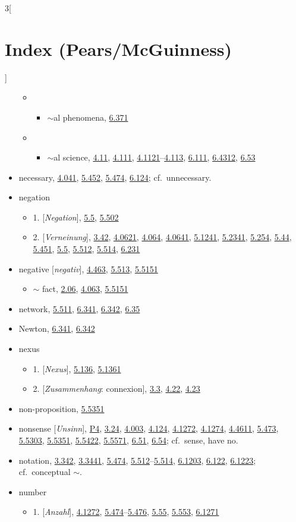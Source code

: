 \documentclass[oneside,openany,12pt]{book}
\newcommand{\indexentry}[1]{\item #1}
\newcommand{\indexsubentry}[1]{\begin{itemize} \item #1 \end{itemize}}
\newcommand{\indexsubsubentry}[1]{\begin{itemize} \item \begin{itemize} \item #1 \end{itemize} \end{itemize}}
\newcommand{\indexref}[1]{\hyperlink{prop#1}{#1}}
\begin{document}
\begin{multicols}{3}[\section*{Index (Pears/McGuinness)}]
\begin{itemize}
   \indexsubsubentry{$\sim$al phenomena, \indexref{6.371}}

   \indexsubsubentry{$\sim$al science, \indexref{4.11}, \indexref{4.111}, \indexref{4.1121}--\indexref{4.113}, \indexref{6.111}, \indexref{6.4312}, \indexref{6.53}}

\indexentry{necessary, \indexref{4.041}, \indexref{5.452}, \indexref{5.474}, \indexref{6.124}; cf.\ unnecessary.}

\indexentry{negation}

   \indexsubentry{1. [\textit{Negation}], \indexref{5.5}, \indexref{5.502}}

   \indexsubentry{2. [\textit{Verneinung}], \indexref{3.42}, \indexref{4.0621}, \indexref{4.064}, \indexref{4.0641}, \indexref{5.1241}, \indexref{5.2341}, \indexref{5.254}, \indexref{5.44}, \indexref{5.451}, \indexref{5.5}, \indexref{5.512}, \indexref{5.514}, \indexref{6.231}}

\indexentry{negative [\textit{negativ}], \indexref{4.463}, \indexref{5.513}, \indexref{5.5151}}

   \indexsubentry{$\sim$ fact, \indexref{2.06}, \indexref{4.063}, \indexref{5.5151}}

\indexentry{network, \indexref{5.511}, \indexref{6.341}, \indexref{6.342}, \indexref{6.35}}

\indexentry{Newton, \indexref{6.341}, \indexref{6.342}}

\indexentry{nexus}

   \indexsubentry{1. [\textit{Nexus}], \indexref{5.136}, \indexref{5.1361}}

   \indexsubentry{2. [\textit{Zusammenhang}: connexion], \indexref{3.3}, \indexref{4.22}, \indexref{4.23}}

\indexentry{non-proposition, \indexref{5.5351}}

\indexentry{nonsense [\textit{Unsinn}], \hyperlink{pref4}{P4}, \indexref{3.24}, \indexref{4.003}, \indexref{4.124}, \indexref{4.1272}, \indexref{4.1274}, \indexref{4.4611}, \indexref{5.473}, \indexref{5.5303}, \indexref{5.5351}, \indexref{5.5422}, \indexref{5.5571}, \indexref{6.51}, \indexref{6.54}; cf.\ sense, have no.}

\indexentry{notation, \indexref{3.342}, \indexref{3.3441}, \indexref{5.474}, \indexref{5.512}--\indexref{5.514}, \indexref{6.1203}, \indexref{6.122}, \indexref{6.1223}; cf.\ conceptual $\sim$.}

\indexentry{number}

   \indexsubentry{1. [\textit{Anzahl}], \indexref{4.1272}, \indexref{5.474}--\indexref{5.476}, \indexref{5.55}, \indexref{5.553}, \indexref{6.1271}}


\end{itemize}
\end{multicols}
\end{document}
